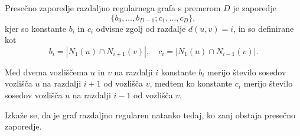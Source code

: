 \documentclass[fin1, tisk]{fmfdelo}
\begin{document}
\begin{definicija}\label{def:presecno_zaporedje}
    Presečno zaporedje razdaljno regularnega grafa s premerom $D$ je zaporedje 
    $$\{b_0, \ldots, b_{D-1}; c_1, \ldots, c_D\},$$
    kjer so konstante $b_i$ in $c_i$ odvisne zgolj od razdalje $d(u, v) = i$, in so definirane kot
    $$b_i = |N_1(u)\cap N_{i+1}(v)|, \quad c_i = |N_1(u)\cap N_{i-1}(v)|.$$
\end{definicija}

\begin{opomba}\label{op:presecno_zaporedje}
    Med dvema vozliščema $u$ in $v$ na razdalji $i$ konstante $b_i$ merijo število sosedov vozlišča 
    $u$ na razdalji $i+1$ od vozlišča $v$, medtem ko konstante $c_i$
    merijo število sosedov vozlišča $u$ na razdalji $i-1$ od vozlišča $v$.
\end{opomba}

\begin{opomba}
    Izkaže se, da je graf razdaljno regularen natanko tedaj, ko zanj obstaja presečno zaporedje.
\end{opomba}

    

\end{document}
